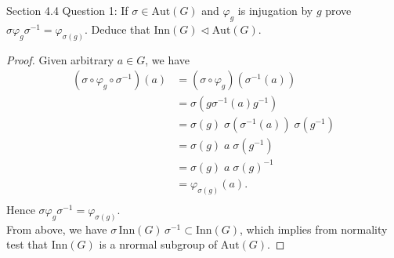 Section 4.4 Question 1: If $\sigma\in\text{Aut}(G)$ and $\varphi_g$ is
injugation by $g$ prove $\sigma\varphi_g\sigma^{-1}=\varphi_{\sigma(g)}$.
Deduce that $\text{Inn}(G)\triangleleft\text{Aut}(G)$.

\begin{proof}
  Given arbitrary $a\in G$, we have
  \begin{align*}
    (\sigma\circ\varphi_g\circ\sigma^{-1})(a) &=
      (\sigma\circ\varphi_g)(\sigma^{-1}(a)) \\
      &= \sigma(g\sigma^{-1}(a)g^{-1}) \\
      &= \sigma(g)\; \sigma(\sigma^{-1}(a))\; \sigma(g^{-1}) \\
      &= \sigma(g)\; a\; \sigma(g^{-1}) \\
      &= \sigma(g)\; a\; \sigma(g)^{-1} \\
      &= \varphi_{\sigma(g)}(a). \\
  \end{align*}
  Hence $\sigma\varphi_g\sigma^{-1}=\varphi_{\sigma(g)}$. \\

  From above, we have $\sigma\,\text{Inn}(G)\,\sigma^{-1}\subset\text{Inn}(G)$,
  which implies from normality test that $\text{Inn}(G)$ is a nrormal
  subgroup of $\text{Aut}(G)$.
\end{proof}
